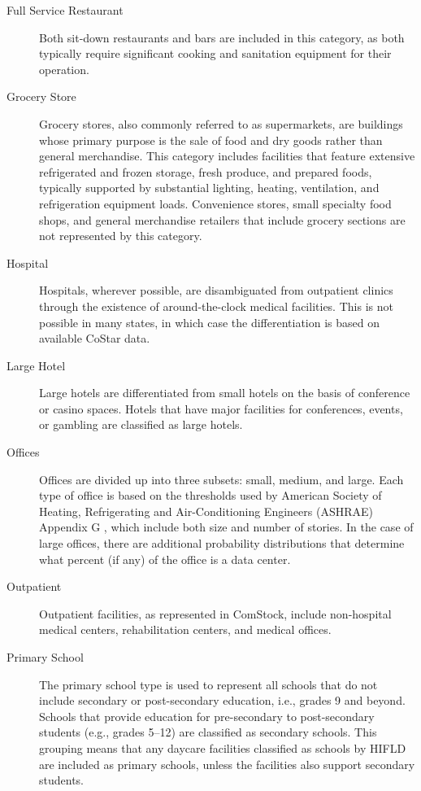 \begin{description}
\item [Full Service Restaurant] Both sit-down restaurants and bars are included in this category, as both typically require significant cooking and sanitation equipment for their operation.
\item[Grocery Store] Grocery stores, also commonly referred to as supermarkets, are buildings whose primary purpose is the sale of food and dry goods rather than general merchandise. This category includes facilities that feature extensive refrigerated and frozen storage, fresh produce, and prepared foods, typically supported by substantial lighting, heating, ventilation, and refrigeration equipment loads. Convenience stores, small specialty food shops, and general merchandise retailers that include grocery sections are not represented by this category.
\item[Hospital] Hospitals, wherever possible, are disambiguated from outpatient clinics through the existence of around-the-clock medical facilities. This is not possible in many states, in which case the differentiation is based on available CoStar data.
\item[Large Hotel] Large hotels are differentiated from small hotels on the basis of conference or casino spaces. Hotels that have major facilities for conferences, events, or gambling are classified as large hotels.
\item[Offices] Offices are divided up into three subsets: small, medium, and large. Each type of office is based on the thresholds used by American Society of Heating, Refrigerating and Air-Conditioning Engineers (ASHRAE) Appendix G \citep{ashrae_901_2010}, which include both size and number of stories. In the case of large offices, there are additional probability distributions that determine what percent (if any) of the office is a data center.
\item[Outpatient] Outpatient facilities, as represented in ComStock, include non-hospital medical centers, rehabilitation centers, and medical offices.
\item[Primary School] The primary school type is used to represent all schools that do not include secondary or post-secondary education, i.e., grades 9 and beyond. Schools that provide education for pre-secondary to post-secondary students (e.g., grades 5--12) are classified as secondary schools. This grouping means that any daycare facilities classified as schools by HIFLD are included as primary schools, unless the facilities also support secondary students.

\end{description}
